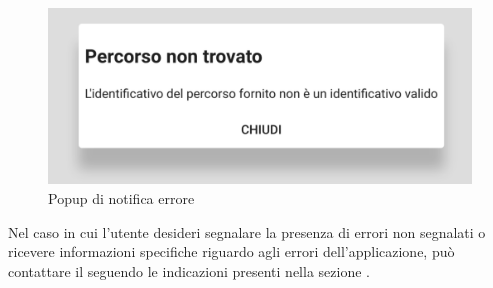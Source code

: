 \begin{figure}[H]
\centering
\includegraphics[scale=0.5]{immagini/errore.pdf}
\caption{Popup di notifica errore}
\end{figure}
Nel caso in cui l'utente desideri segnalare la presenza di errori non segnalati o ricevere informazioni specifiche riguardo agli errori dell'applicazione, può contattare il  seguendo le indicazioni presenti nella sezione \textit{}.
